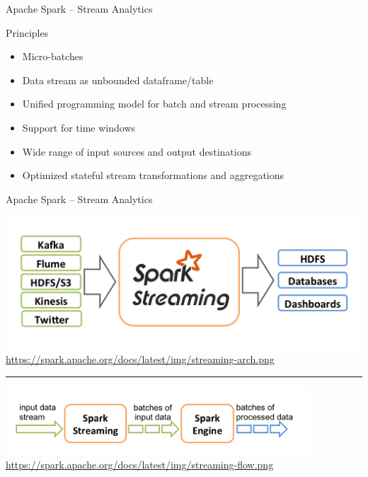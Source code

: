 \documentclass[ignorenonframetext,xcolor=x11names]{beamer}
\begin{document}
\begin{frame}{Apache Spark -- Stream Analytics}
\begin{block}{Principles}
\begin{itemize}
    \item Micro-batches
    \item Data stream as unbounded dataframe/table
    \item Unified programming model for batch and stream processing
    \item Support for time windows
    \item Wide range of input sources and output destinations
    \item Optimized stateful stream transformations and aggregations
\end{itemize}
\end{block}
\end{frame}

\begin{frame}{Apache Spark -- Stream Analytics}
\centering

\includegraphics[width=.8\textwidth]{streaming-arch.png} \\
\scriptsize\url{https://spark.apache.org/docs/latest/img/streaming-arch.png}\normalsize \\

\vspace{\baselineskip}

\hrule

\vspace{\baselineskip}

\includegraphics[height=1in]{streaming-flow.png}  \\

\scriptsize\url{https://spark.apache.org/docs/latest/img/streaming-flow.png}
\end{frame}
\end{document}

